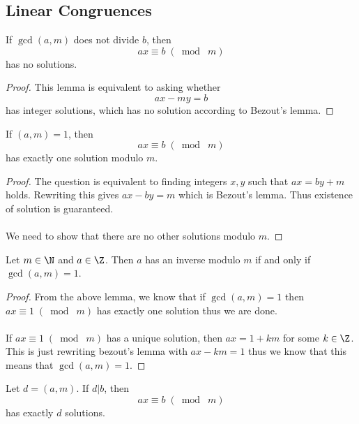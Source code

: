 \documentclass[a4paper]{article}
\begin{document}
\subsection{Linear Congruences}
\begin{lmm}{}{} If $\gcd(a,m)$ does not divide $b$, then $$ax\equiv b\;(\bmod\;m)$$ has no solutions. \tcbline
\begin{proof}
This lemma is equivalent to asking whether $$ax-my=b$$ has integer solutions, which has no solution according to Bezout's lemma. 
\end{proof}
\end{lmm}

\begin{lmm}{}{} If $(a,m)=1$, then $$ax\equiv b\;(\bmod\;m)$$ has exactly one solution modulo $m$. \tcbline
\begin{proof}
The question is equivalent to finding integers $x,y$ such that $ax=by+m$ holds. Rewriting this gives $ax-by=m$ which is Bezout's lemma. Thus existence of solution is guaranteed. \\~\\
We need to show that there are no other solutions modulo $m$. 
\end{proof}
\end{lmm}

\begin{crl}{}{} Let $m\in\N$ and $a\in\Z$. Then $a$ has an inverse modulo $m$ if and only if $\gcd(a,m)=1$. \tcbline
\begin{proof} From the above lemma, we know that if $\gcd(a,m)=1$ then $ax\equiv 1\;(\bmod\;m)$ has exactly one solution thus we are done. \\~\\
If $ax\equiv 1\;(\bmod\;m)$ has a unique solution, then $ax=1+km$ for some $k\in\Z$. This is just rewriting bezout's lemma with $ax-km=1$ thus we know that this means that $\gcd(a,m)=1$. 
\end{proof}
\end{crl}

\begin{lmm}{}{} Let $d=(a,m)$. If $d|b$, then $$ax\equiv b\;(\bmod\;m)$$ has exactly $d$ solutions. 
\end{lmm}
\end{document}
